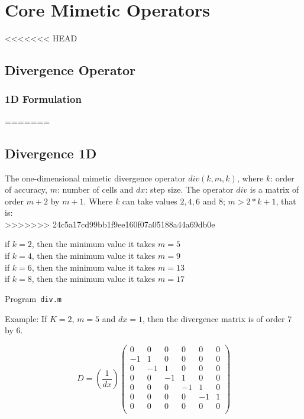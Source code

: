 \chapter{Core Mimetic Operators}

<<<<<<< HEAD
\section{Divergence Operator}

\subsection{1D Formulation}
=======
\section{Divergence 1D}
The one-dimensional mimetic divergence operator $div(k,m,k)$, where $k$: order of accuracy, $m$: number of cells and $dx$: step size. The operator $div$ is a matrix of order $m+2$ by $m+1$. Where $k$ can take values $​​2, 4, 6$ and $8$; $m > 2*k+1$, that is:\\
>>>>>>> 24c5a17cd99bb1f9ee160f07a05188a44a69db0e

if $k=2$, then the minimum value it takes $m=5$\\
if $k=4$, then the minimum value it takes $m=9$\\
if $k=6$, then the minimum value it takes $m=13$\\
if $k=8$, then the minimum value it takes $m=17$\\
\begin{listing}[ht!]
	\tiny
	\centering
	\caption{Program~\texttt{div.m}}
	\label{code:div.m}
\end{listing}


Example: If  $K=2$, $m=5$ and $dx=1$, then the divergence matrix is ​​of order 7 by 6.

\begin{equation}
D= (\frac{1}{dx})\begin{pmatrix}
0 & 0 & 0 & 0 & 0 & 0\\
-1 & 1 & 0 & 0 & 0 & 0\\
0 & -1 & 1 & 0 & 0 & 0\\
0 & 0 & -1 & 1 & 0 & 0\\
0 & 0 & 0 & -1 & 1 & 0\\
0 & 0 & 0 & 0 & -1 & 1\\
0 & 0 & 0 & 0 & 0 & 0\\
\end{pmatrix}
\end{equation} 



